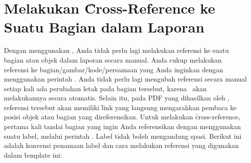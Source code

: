 \section{Melakukan \f{Cross-Reference} ke Suatu Bagian dalam Laporan}
\label{sec:crossReference}
Dengan menggunakan \latex, Anda tidak perlu lagi melakukan referensi ke suatu bagian atau objek dalam laporan secara manual.
Anda cukup melakukan referensi ke bagian/gambar/kode/persamaan yang Anda inginkan dengan menggunakan perintah .
Anda tidak perlu lagi mengubah referensi secara manual setiap kali ada perubahan letak pada bagian tersebut, karena \latex~akan melakukannya secara otomatis.
Selain itu, pada PDF yang dihasilkan oleh \latex, referensi tersebut akan memiliki \f{link} yang langsung mengarahkan pembaca ke posisi objek atau bagian yang direferensikan.
Untuk melakukan \f{cross-reference}, pertama kali tandai bagian yang ingin Anda referensikan dengan menggunakan suatu label, melalui perintah .
Label tidak boleh mengandung spasi. Berikut ini adalah konvensi penamaan label dan cara melakukan referensi yang digunakan dalam \f{template} ini:
